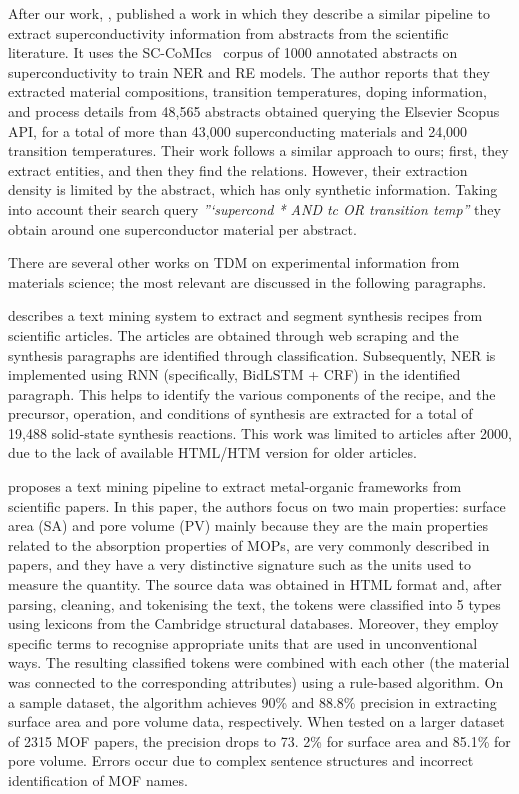 After our work, \cite{mitsui2023automatic}, published a work in which they describe a similar pipeline to extract superconductivity information from abstracts from the scientific literature.
It uses the SC-CoMIcs~\cite{yamaguchi-etal-2020-sc} corpus of 1000 annotated abstracts on superconductivity to train NER and RE models.
The author reports that they extracted material compositions, transition temperatures, doping information, and process details from 48,565 abstracts obtained querying the Elsevier Scopus API, for a total of more than 43,000 superconducting materials and 24,000 transition temperatures. 
Their work follows a similar approach to ours; first, they extract entities, and then they find the relations. 
However, their extraction density is limited by the abstract, which has only synthetic information. Taking into account their search query \textit{''‘supercond * AND tc OR transition temp''} they obtain around one superconductor material per abstract. 

There are several other works on TDM on experimental information from materials science; the most relevant are discussed in the following paragraphs. 

\cite{kononova2019text} describes a text mining system to extract and segment synthesis recipes from scientific articles. The articles are obtained through web scraping and the synthesis paragraphs are identified through classification. Subsequently, NER is implemented using RNN (specifically, BidLSTM + CRF) in the identified paragraph. This helps to identify the various components of the recipe, and the precursor, operation, and conditions of synthesis are extracted for a total of 19,488 solid-state synthesis reactions.
This work was limited to articles after 2000, due to the lack of available HTML/HTM version for older articles.

\cite{park2018text} proposes a text mining pipeline to extract metal-organic frameworks from scientific papers. In this paper, the authors focus on two main properties: surface area (SA) and pore volume (PV) mainly because they are the main properties related to the absorption properties of MOPs, are very commonly described in papers, and they have a very distinctive signature such as the units used to measure the quantity. 
The source data was obtained in HTML format and, after parsing, cleaning, and tokenising the text, the tokens were classified into 5 types using lexicons from the Cambridge structural databases. 
Moreover, they employ specific terms to recognise appropriate units that are used in unconventional ways. The resulting classified tokens were combined with each other (the material was connected to the corresponding attributes) using a rule-based algorithm.
On a sample dataset, the algorithm achieves 90\% and 88.8\% precision in extracting surface area and pore volume data, respectively.
When tested on a larger dataset of 2315 MOF papers, the precision drops to 73. 2\% for surface area and 85.1\% for pore volume. Errors occur due to complex sentence structures and incorrect identification of MOF names.

